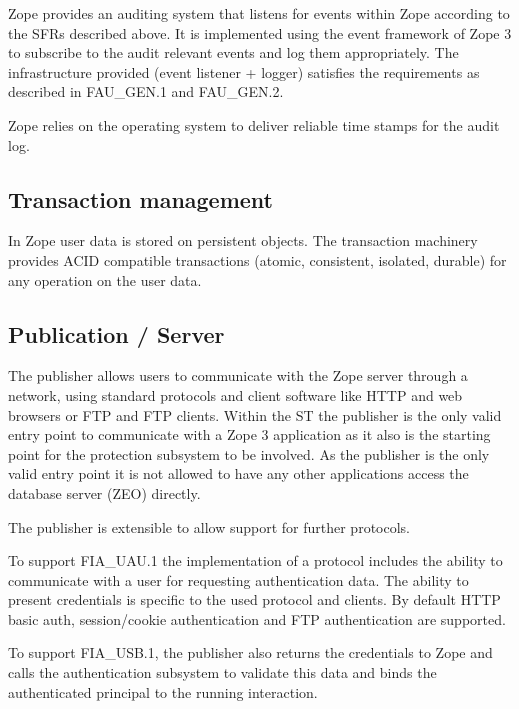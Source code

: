 \documentclass[12pt,english]{scrbook}
\begin{document}
Zope provides an auditing system that listens for events within Zope according
to the SFRs described above. It is implemented using the event framework of
Zope 3 to subscribe to the audit relevant events and log them appropriately.
The infrastructure provided (event listener + logger) satisfies the
requirements as described in FAU{\_}GEN.1 and FAU{\_}GEN.2.

Zope relies on the operating system to deliver reliable time stamps for the
audit log.





\subsection{Transaction management}

In Zope user data is stored on persistent objects. The transaction machinery
provides ACID compatible transactions (atomic, consistent, isolated, durable)
for any operation on the user data.


\subsection{Publication / Server}

The publisher allows users to communicate with the Zope server through a
network, using standard protocols and client software like HTTP and web
browsers or FTP and FTP clients. Within the ST the publisher is the only valid
entry point to communicate with a Zope 3 application as it also is the
starting point for the protection subsystem to be involved. As the publisher
is the only valid entry point it is not allowed to have any other applications
access the database server (ZEO) directly.

The publisher is extensible to allow support for further protocols.

To support FIA{\_}UAU.1 the implementation of a protocol includes the ability
to communicate with a user for requesting authentication data. The ability to
present credentials is specific to the used protocol and clients. By default
HTTP basic auth, session/cookie authentication and FTP authentication are
supported.

To support FIA{\_}USB.1, the publisher also returns the credentials to Zope and
calls the authentication subsystem to validate this data and binds the
authenticated principal to the running interaction.
\end{document}
